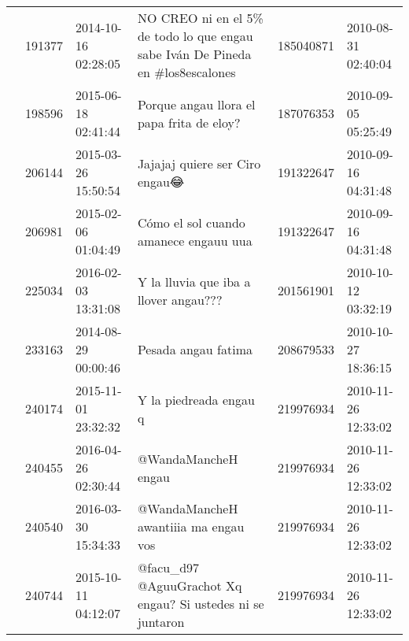 \begin{tabular}{llllrl}
           & 191377  & 2014-10-16 02:28:05 &                                                               NO CREO ni en el 5\% de todo lo que engau sabe Iván De Pineda en \#los8escalones &   185040871 & 2010-08-31 02:40:04 \\
           & 198596  & 2015-06-18 02:41:44 &                                                                                                    Porque angau llora el papa frita de eloy? &   187076353 & 2010-09-05 05:25:49 \\
           & 206144  & 2015-03-26 15:50:54 &                                                                                                               Jajajaj quiere ser Ciro engau😂 &   191322647 & 2010-09-16 04:31:48 \\
           & 206981  & 2015-02-06 01:04:49 &                                                                                                        Cómo el sol cuando amanece engauu uua &   191322647 & 2010-09-16 04:31:48 \\
           & 225034  & 2016-02-03 13:31:08 &                                                                                                        Y la lluvia que iba a llover angau??? &   201561901 & 2010-10-12 03:32:19 \\
           & 233163  & 2014-08-29 00:00:46 &                                                                                                                          Pesada angau fatima &   208679533 & 2010-10-27 18:36:15 \\
           & 240174  & 2015-11-01 23:32:32 &                                                                                                                       Y la piedreada engau q &   219976934 & 2010-11-26 12:33:02 \\
           & 240455  & 2016-04-26 02:30:44 &                                                                                                                          @WandaMancheH engau &   219976934 & 2010-11-26 12:33:02 \\
           & 240540  & 2016-03-30 15:34:33 &                                                                                                         @WandaMancheH awantiiia ma engau vos &   219976934 & 2010-11-26 12:33:02 \\
           & 240744  & 2015-10-11 04:12:07 &                                                                                   @facu\_d97 @AguuGrachot Xq engau? Si ustedes ni se juntaron &   219976934 & 2010-11-26 12:33:02 \\

\end{tabular}
